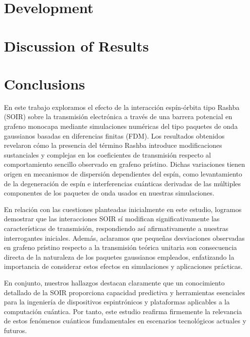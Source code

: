 \documentclass[twocolumn, aps, prb, 10pt]{revtex4-2}
\begin{document}


    \section{Development}\label{sec:development}
    


    \section{Discussion of Results}\label{sec:discussion-of-results}
    


    \section{Conclusions}\label{sec:conclusions}

    En este trabajo exploramos el efecto de la interacción espín-órbita tipo Rashba (SOIR) sobre la transmisión electrónica a través de una barrera potencial en grafeno monocapa mediante simulaciones numéricas del tipo paquetes de onda gaussianos basadas en diferencias finitas (FDM). Los resultados obtenidos revelaron cómo la presencia del término Rashba introduce modificaciones sustanciales y complejas en los coeficientes de transmisión respecto al comportamiento sencillo observado en grafeno prístino.
    Dichas variaciones tienen origen en mecanismos de dispersión dependientes del espín, como levantamiento de la degeneración de espín e interferencias cuánticas derivadas de las múltiples componentes de los paquetes de onda usados en nuestras simulaciones.

    En relación con las cuestiones planteadas inicialmente en este estudio, logramos demostrar que las interacciones SOIR sí modifican significativamente las características de transmisión, respondiendo así afirmativamente a nuestras interrogantes iniciales.
    Además, aclaramos que pequeñas desviaciones observadas en grafeno prístino respecto a la transmisión teórica unitaria son consecuencia directa de la naturaleza de los paquetes gaussianos empleados, enfatizando la importancia de considerar estos efectos en simulaciones y aplicaciones prácticas.

    En conjunto, nuestros hallazgos destacan claramente que un conocimiento detallado de la SOIR proporciona capacidad predictiva y herramientas esenciales para la ingeniería de dispositivos espintrónicos y plataformas aplicables a la computación cuántica.
    Por tanto, este estudio reafirma firmemente la relevancia de estos fenómenos cuánticos fundamentales en escenarios tecnológicos actuales y futuros.


    \pagebreak


    
    
\end{document}
